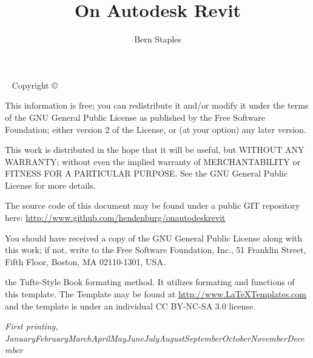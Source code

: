 \documentclass{tufte-book} %
\title{On Autodesk Revit} %
\author{Bern Staples} %
\newcommand{\monthyear}{\ifcase\month\or January\or February\or March\or April\or May\or June\or July\or August\or September\or October\or November\or December\fi\space\number\year} %
\begin{document}

\maketitle %


\newpage
\begin{fullwidth}
~\vfill
\thispagestyle{empty}
\setlength{\parindent}{0pt}
\setlength{\parskip}{\baselineskip}
Copyright \copyright\ \the\year\ \thanklessauthor

\par{}

\par{}

\par{}

\par  This information is free; you can redistribute it and/or modify it
    under the terms of the GNU General Public License as published by
    the Free Software Foundation; either version 2 of the License, or
    (at your option) any later version.

    This work is distributed in the hope that it will be useful,
    but WITHOUT ANY WARRANTY; without even the implied warranty of
    MERCHANTABILITY or FITNESS FOR A PARTICULAR PURPOSE.  See the
    GNU General Public License for more details.
    
    The source code of this document may be found under a public GIT repository here: \url{http://www.github.com/hendenburg/onautodeskrevit}

    You should have received a copy of the GNU General Public License
    along with this work; if not, write to the Free Software
    Foundation, Inc., 51 Franklin Street, Fifth Floor, Boston, MA 02110-1301, USA.
    
     the Tufte-Style Book formating method. It utilizes formating and functions of this template. The Template may be found at \url{http://www.LaTeXTemplates.com} and the template is under an individual CC BY-NC-SA 3.0 license.  
\par\textit{First printing, \monthyear}
\end{fullwidth}
\end{document}
